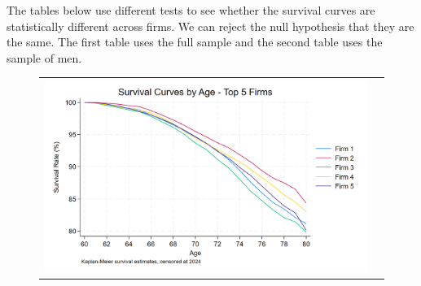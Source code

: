 \documentclass[12pt]{article}
\begin{document}
The tables below use different tests to see whether the survival curves are statistically different across firms. We can reject the null hypothesis that they are the same. The first table uses the full sample and the second table uses the sample of men. 

 
  \begin{figure}[H]
\caption{}
 \label{fig:ie4_14}
\centering{}%
\begin{tabular}{cc}
\includegraphics[scale=0.2]{../figures/IE4/IE4_survival_curves_by_age_top_firms.png} 
\end{tabular}
\end{figure} 
\end{document}
